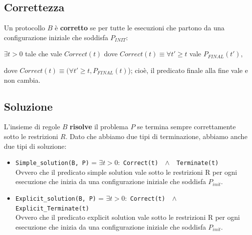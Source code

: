 \subsection{Correttezza}

\begin{definition}
    Un protocollo $B$ è \textbf{corretto} se per tutte le esecuzioni
    che partono da una configurazione iniziale che soddisfa $P_{INIT}$:

    \begin{center}
        $\exists t>0$ tale che vale $Correct(t)$ dove $Correct(t) \equiv \forall t'
            \geq t$ vale $P_{FINAL}(t')$,
    \end{center}

\end{definition}

dove $Correct(t) \equiv (\forall t' \ge t, P_{FINAL}(t)$); cioè, il predicato
finale alla fine vale e non cambia.

\subsection{Soluzione}
L'insieme di regole $B$ \textbf{risolve} il problema $P$ se termina sempre
correttamente sotto le restrizioni $R$. Dato che abbiamo due tipi di
terminazione, abbiamo anche due tipi di soluzione:
\begin{itemize}
    \item \texttt{Simple\_solution(B, P)} = $\exists t > 0 :$ \texttt{Correct(t)}
          $ ~~ \wedge ~~$ \texttt{Terminate(t)}\\
          Ovvero che il predicato simple solution vale sotto le restrizioni R per
          ogni esecuzione che inizia da una configurazione iniziale che soddisfa
          $P_{init}$.

    \item \texttt{Explicit\_solution(B, P)} = $\exists t > 0 :$
          \texttt{Correct(t)} $ ~~ \wedge ~~$ \texttt{Explicit\_Terminate(t)}\\
          Ovvero che il predicato explicit solution vale sotto le restrizioni R
          per ogni esecuzione che inizia da una configurazione iniziale che
          soddisfa $P_{init}$.
\end{itemize}

